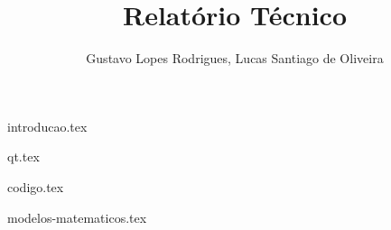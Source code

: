 \documentclass{ol-softwaremanual}
\title{Relatório Técnico }
\author{Gustavo Lopes Rodrigues, Lucas Santiago de Oliveira}
\begin{document}
\maketitle

\tableofcontents
\newpage

{introducao.tex}

{qt.tex}

{codigo.tex}

{modelos-matematicos.tex}
\end{document}
